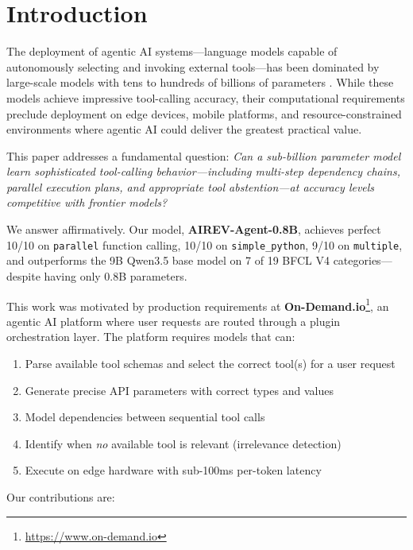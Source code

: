 \documentclass[10pt,twocolumn]{article}
\begin{document}
\section{Introduction}

The deployment of agentic AI systems---language models capable of autonomously selecting and invoking external tools---has been dominated by large-scale models with tens to hundreds of billions of parameters \citep{schick2023toolformer, patil2023gorilla, qin2024toolllm}. While these models achieve impressive tool-calling accuracy, their computational requirements preclude deployment on edge devices, mobile platforms, and resource-constrained environments where agentic AI could deliver the greatest practical value.

This paper addresses a fundamental question: \textit{Can a sub-billion parameter model learn sophisticated tool-calling behavior---including multi-step dependency chains, parallel execution plans, and appropriate tool abstention---at accuracy levels competitive with frontier models?}

We answer affirmatively. Our model, \textbf{AIREV-Agent-0.8B}, achieves perfect 10/10 on \texttt{parallel} function calling, 10/10 on \texttt{simple\_python}, 9/10 on \texttt{multiple}, and outperforms the 9B Qwen3.5 base model on 7 of 19 BFCL V4 categories---despite having only 0.8B parameters.

This work was motivated by production requirements at \textbf{On-Demand.io}\footnote{\url{https://www.on-demand.io}}, an agentic AI platform where user requests are routed through a plugin orchestration layer. The platform requires models that can:

\begin{enumerate}[itemsep=1pt, topsep=3pt]
    \item Parse available tool schemas and select the correct tool(s) for a user request
    \item Generate precise API parameters with correct types and values
    \item Model dependencies between sequential tool calls
    \item Identify when \textit{no} available tool is relevant (irrelevance detection)
    \item Execute on edge hardware with sub-100ms per-token latency
\end{enumerate}

\noindent Our contributions are:
\end{document}
